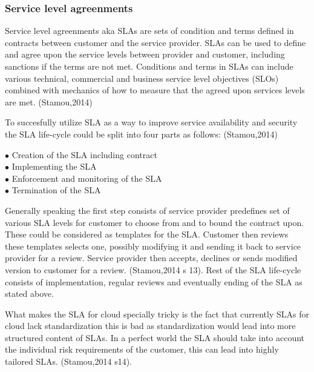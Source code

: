 \documentclass{article}
\begin{document}
\subsubsection{Service level agreenments}
Service level agreenments aka SLAs are sets of condition and terms defined in contracts between customer and the service provider. SLAs can be used to define and agree upon the service levels between provider and customer, including sanctions if the terms are not met. Conditions and terms in SLAs can include various technical, commercial and business service level objectives (SLOs) combined with mechanics of how to measure that the agreed upon services levels are met. (Stamou,2014)
\par
To succesfully utilize SLA as a way to improve service availability and security the SLA life-cycle could be split into four parts as follows: (Stamou,2014)
\begin{description}
        \item[$\bullet$ Creation of the SLA including contract]
        \item[$\bullet$ Implementing the SLA]
        \item[$\bullet$ Enforcement and monitoring of the SLA]
        \item[$\bullet$ Termination of the SLA]
\end{description}
Generally speaking the first step consists of service provider predefines set of various SLA levels for customer to choose from and to bound the contract upon. These could be considered as templates for the SLA. Customer then reviews these templates selects one, possibly modifying it and sending it back to service provider for a review. Service provider then accepts, declines or sends modified version to customer for a review. (Stamou,2014 s 13). Rest of the SLA life-cycle consists of implementation, regular reviews and eventually ending of the SLA as stated above.
\par
What makes the SLA for cloud specially tricky is the fact that currently SLAs for cloud lack standardization this is bad as standardization would lead into more structured content of SLAs. In a perfect world the SLA should take into account the individual risk requirements of the customer, this can lead into highly tailored SLAs. (Stamou,2014 s14).
\end{document}
